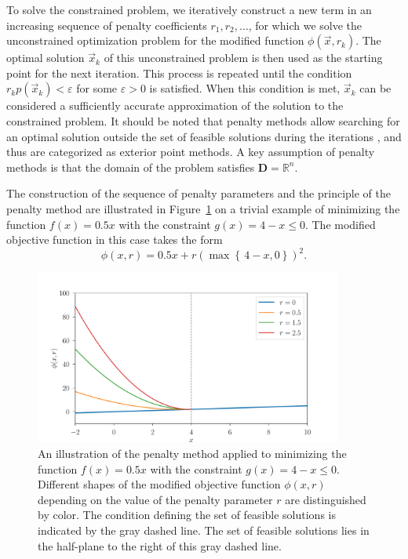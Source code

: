 To solve the constrained problem, we iteratively construct a new term in an increasing sequence of penalty coefficients $ r_1, r_2, \dots$, for which we solve the unconstrained optimization problem for the modified function $ \phi (\vec{x}, r_k)$. The optimal solution $ \vec{x}_k $ of this unconstrained problem is then used as the starting point for the next iteration. This process is repeated until the condition $ r_k p(\vec{x}_k) < \varepsilon$ for some $ \varepsilon > 0$ is satisfied. When this condition is met, $ \vec{x}_k $ can be considered a sufficiently accurate approximation of the solution to the constrained problem. It should be noted that penalty methods allow searching for an optimal solution outside the set of feasible solutions during the iterations \cite{non-linear-textbook}, and thus are categorized as exterior point methods. A key assumption of penalty methods is that the domain of the problem satisfies $ \mathbf{D} = \mathbb{R}^n $.

The construction of the sequence of penalty parameters and the principle of the penalty method are illustrated in Figure~\ref{fig:penalty} on a trivial example of minimizing the function $ f(x) = 0.5x $ with the constraint $ g(x) = 4 - x \leq 0 $. The modified objective function in this case takes the form
\begin{equation}
	\phi (x, r) = 0.5x + r \left(\max  \left\{ \,  4-x, 0 \right\}\right)^2.
\end{equation}
\begin{figure}[H]
	\centering
	\includegraphics[width=0.9\textwidth]{figures/penalty.pdf}
	\caption{An illustration of the penalty method applied to minimizing the function $ f(x) = 0.5x $ with the constraint $ g(x) = 4 - x \leq 0 $. Different shapes of the modified objective function $ \phi (x, r) $ depending on the value of the penalty parameter $ r $ are distinguished by color. The condition defining the set of feasible solutions is indicated by the gray dashed line. The set of feasible solutions lies in the half-plane to the right of this gray dashed line.}
	\label{fig:penalty}
\end{figure}


